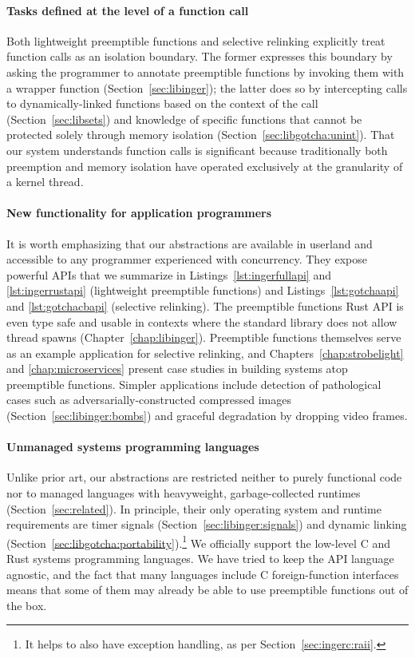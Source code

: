 \paragraph{Tasks defined at the level of a function call}
Both lightweight preemptible functions and selective relinking explicitly treat
function calls as an isolation boundary.  The former expresses this boundary by
asking the programmer to annotate preemptible functions by invoking them with a
wrapper function (Section~\ref{sec:libinger}); the latter does so by intercepting
calls to dynamically-linked functions based on the context of the call
(Section~\ref{sec:libsets}) and knowledge of specific functions that cannot be
protected solely through memory isolation (Section~\ref{sec:libgotcha:unint}).  That
our system understands function calls is significant because traditionally both
preemption and memory isolation have operated exclusively at the granularity of a
kernel thread.

\paragraph{New functionality for application programmers}
It is worth emphasizing that our abstractions are available in userland and
accessible to any programmer experienced with concurrency.  They expose powerful APIs
that we summarize in Listings~\ref{lst:ingerfullapi} and \ref{lst:ingerrustapi}
(lightweight preemptible functions) and Listings~\ref{lst:gotchaapi} and
\ref{lst:gotchacbapi} (selective relinking).  The preemptible functions Rust API is
even type safe and usable in contexts where the standard library does not allow
thread spawns (Chapter~\ref{chap:libinger}).  Preemptible functions themselves serve
as an example application for selective relinking, and
Chapters~\ref{chap:strobelight} and
\ref{chap:microservices} present case studies in building systems atop preemptible
functions.  Simpler applications include detection of pathological cases such as
adversarially-constructed compressed images (Section~\ref{sec:libinger:bombs}) and
graceful degradation by dropping video frames.

\paragraph{Unmanaged systems programming languages}
Unlike prior art, our abstractions are restricted neither to purely functional code
nor to managed languages with heavyweight, garbage-collected runtimes
(Section~\ref{sec:related}).  In principle, their only operating system and runtime
requirements are timer signals (Section~\ref{sec:libinger:signals}) and dynamic
linking (Section~\ref{sec:libgotcha:portability}).\footnote{It helps to also have
exception handling, as per Section~\ref{sec:ingerc:raii}.}  We officially support the
low-level C and Rust systems programming languages.  We have tried to keep the API
language agnostic, and the fact that many languages include C foreign-function
interfaces means that some of them may already be able to use preemptible functions
out of the box.

